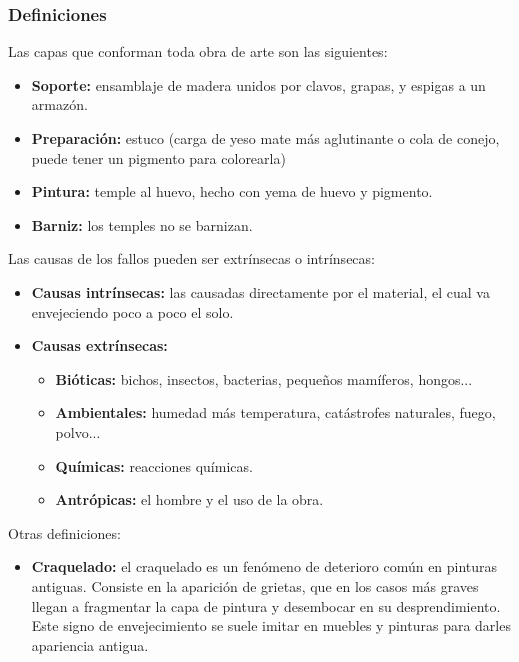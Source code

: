 \documentclass[a4paper,11pt]{article}
\begin{document}
			\subsubsection{Definiciones}
			Las capas que conforman toda obra de arte son las siguientes:
			\begin{itemize}
			  \item \textbf{Soporte:} ensamblaje de madera unidos por clavos, grapas, y
			  espigas a un armazón.
			  \item \textbf{Preparación:} estuco (carga de yeso mate más aglutinante o
			  cola de conejo, puede tener un pigmento para colorearla)
			  \item \textbf{Pintura:} temple al huevo, hecho con yema de huevo y
			  pigmento.
			  \item \textbf{Barniz:} los temples no se barnizan.
			\end{itemize}
			\newpage
			Las causas de los fallos pueden ser extrínsecas o intrínsecas:
			\begin{itemize}
			  \item \textbf{Causas intrínsecas:} las causadas directamente por el
			  material, el cual va envejeciendo poco a poco el solo.
			  \item \textbf{Causas extrínsecas:}
			  \begin{itemize}
			  \item \textbf{Bióticas:} bichos, insectos, bacterias, pequeños mamíferos,
hongos...
 			  \item \textbf{Ambientales:} humedad más temperatura, catástrofes
naturales, fuego, polvo...
 			  \item \textbf{Químicas:} reacciones químicas.
			  \item \textbf{Antrópicas:} el hombre y el uso de la obra.
			  \end{itemize}
			\end{itemize}
			Otras definiciones:
			\begin{itemize}
			\item \textbf{Craquelado:} el craquelado es un fenómeno de deterioro común en
			pinturas antiguas. Consiste en la aparición de grietas, que en los casos más graves llegan a fragmentar la capa de pintura y desembocar en su desprendimiento. Este signo de envejecimiento se suele imitar en muebles y pinturas para darles apariencia antigua.
			\end{itemize}
\end{document}
